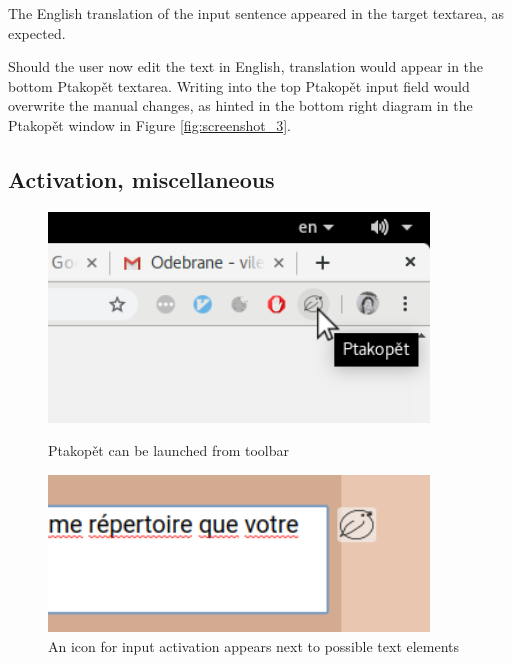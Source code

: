 \documentclass[a4paper]{article}
\begin{document}
The English translation of the input sentence appeared in the target textarea, as expected.

Should the user now edit the text in English, translation would appear in the bottom Ptakopět textarea. Writing into the top Ptakopět input field would overwrite the manual changes, as hinted in the bottom right diagram in the Ptakopět window in Figure \ref{fig:screenshot_3}.

\subsection{Activation, miscellaneous}
\begin{figure}[h]
\centering
\begin{minipage}{.5\textwidth}
  \centering
  \includegraphics[width=0.9\textwidth]{screenshot_5}
  \caption{Ptakopět can be launched from toolbar}
  \label{fig:screenshot_5}
\end{minipage}%
\begin{minipage}{.5\textwidth}
  \centering
  \vspace{1.5cm}
  \includegraphics[width=0.9\textwidth]{screenshot_6}
  \caption{An icon for input activation appears next to possible text elements}
  \label{fig:screenshot_6}
\end{minipage}
\end{figure}
\vspace{0.3cm}
\end{document}
